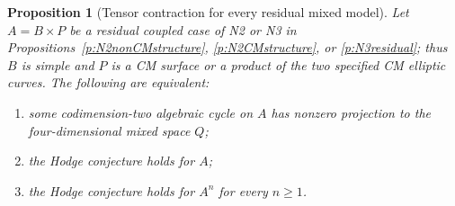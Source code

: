 \documentclass[11pt,reqno]{article}
\theoremstyle{emphasizedplain}
\newtheorem{proposition}[theorem]{Proposition}
\theoremstyle{emphasizeddefinition}
\theoremstyle{emphasizeddefinition}
\begin{document}
\begin{proposition}[Tensor contraction for every residual mixed model]
\label{p:mixed-allpowers}
Let $A=B\times P$ be a residual coupled case of N2 or N3 in
Propositions~\ref{p:N2nonCMstructure}, \ref{p:N2CMstructure}, or
\ref{p:N3residual}; thus $B$ is simple and $P$ is a CM surface or a
product of the two specified CM elliptic curves. The following are
equivalent:
\begin{enumerate}
\item some codimension-two algebraic cycle on $A$ has nonzero
projection to the four-dimensional mixed space $Q$;
\item the Hodge conjecture holds for $A$;
\item the Hodge conjecture holds for $A^n$ for every $n\ge1$.
\end{enumerate}
\end{proposition}
\end{document}
